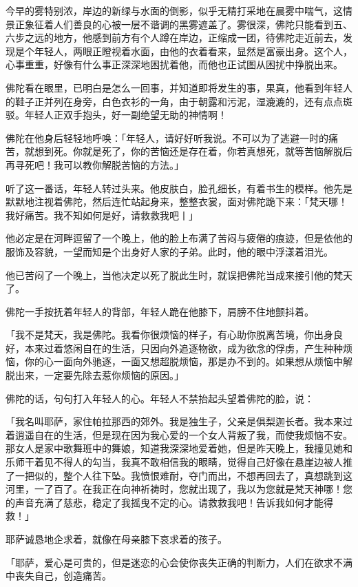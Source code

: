 \documentclass[12pt,twoside,openany]{book}
\begin{document}
今早的雾特别浓，岸边的新绿与水面的倒影，似乎无精打采地在晨雾中喘气，这情景正象征着人们善良的心被一层不谐调的黑雾遮盖了。雾很深，佛陀只能看到五、六步之远的地方，他感到前方有个人蹲在岸边，正缩成一团，待佛陀走近前去，发现是个年轻人，两眼正瞪视着水面，由他的衣着看来，显然是富豪出身。这个人，心事重重，好像有什么事正深深地困扰着他，而他也正试图从困扰中挣脱出来。

佛陀看在眼里，已明白是怎么一回事，并知道即将发生的事，果真，他看到年轻人的鞋子正并列在身旁，白色衣衫的一角，由于朝露和污泥，湿漉漉的，还有点点斑驳。年轻人正双手抱头，好一副绝望无助的神情啊！

佛陀在他身后轻轻地呼唤：「年轻人，请好好听我说。不可以为了逃避一时的痛苦，就想到死。你就是死了，你的苦恼还是存在着，你若真想死，就等苦恼解脱后再寻死吧！我可以教你解脱苦恼的方法。」

听了这一番话，年轻人转过头来。他皮肤白，脸孔细长，有着书生的模样。他先是默默地注视着佛陀，然后连忙站起身来，整整衣裳，面对佛陀跪下来：「梵天哪！我好痛苦。我不知如何是好，请救救我吧丨」

他必定是在河畔逗留了一个晚上，他的脸上布满了苦闷与疲倦的痕迹，但是依他的服饰及容貌，一望而知是个出身好人家的子弟。此时，他的眼中浮漾着泪光。

他已苦闷了一个晚上，当他决定以死了脱此生时，就误把佛陀当成来接引他的梵天了。

佛陀一手按抚着年轻人的背部，年轻人跪在他膝下，肩膀不住地颤抖着。

「我不是梵天，我是佛陀。我看你很烦恼的样子，有心助你脱离苦境，你出身良好，本来过着悠闲自在的生活，只因向外追逐物欲，成为欲念的俘虏，产生种种烦恼，你的心一面向外驰逐，一面又想超脱烦恼，那是办不到的。如果想从烦恼中解脱出来，一定要先除去惹你烦恼的原因。」

佛陀的话，句句打入年轻人的心。年轻人不禁抬起头望着佛陀的脸，说：

「我名叫耶萨，家住帕拉那西的郊外。我是独生子，父亲是俱梨迦长者。我本来过着逍遥自在的生活，但是现在因为我心爱的一个女人背叛了我，而使我烦恼不安。那女人是家中歌舞班中的舞娘，知道我深深地爱着她，但是昨天晚上，我撞见她和乐师干着见不得人的勾当，我真不敢相信我的眼睛，觉得自己好像在悬崖边被人推了一把似的，整个人往下坠。我愤恨难耐，夺门而出，不想再回去了，真想跳到这河里，一了百了。在我正在向神祈祷时，您就出现了，我以为您就是梵天神哪！您的声音充满了慈悲，稳定了我摇曳不定的心。请救救我吧！告诉我如何才能得救！」

耶萨诚恳地企求着，就像在母亲膝下哀求着的孩子。

「耶萨，爱心是可贵的，但是迷恋的心会使你丧失正确的判断力，人们在欲求不满中丧失自己，创造痛苦。
\end{document}
